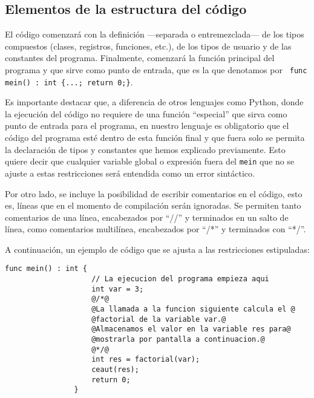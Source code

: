 \documentclass[10pt,a4paper]{article}
\begin{document}
\subsection{Elementos de la estructura del código}\label{subsec:Elementos de la estructura del código}
El código comenzará con la definición ---separada o entremezclada--- de los tipos compuestos (clases, registros, funciones, etc.), de los tipos de usuario y de las constantes del programa. Finalmente, comenzará la función principal del programa y que sirve como punto de entrada, que es la que denotamos por \texttt{\color{blue} func mein() : int \{...; return 0;\}}.

Es importante destacar que, a diferencia de otros lenguajes como Python, donde la ejecución del código no requiere de una función ``especial'' que sirva como punto de entrada para el programa, en nuestro lenguaje es obligatorio que el código del programa esté dentro de esta función final y que fuera solo se permita la declaración de tipos y constantes que hemos explicado previamente. Esto quiere decir que cualquier variable global o expresión fuera del \texttt{mein} que no se ajuste a estas restricciones será entendida como un error sintáctico.

Por otro lado, se incluye la posibilidad de escribir comentarios en el código, esto es, líneas que en el momento de compilación serán ignoradas. Se permiten tanto comentarios de una línea, encabezados por ``//'' y terminados en un salto de línea, como comentarios multilínea, encabezados por ``/*'' y terminados con ``*/''.

A continuación, un ejemplo de código que se ajusta a las restricciones estipuladas:

\begin{center}
    \begin{minipage}{\linewidth}
        \begin{lstlisting}[linewidth=0.7\linewidth, gobble=16]
                func mein() : int {
                    // La ejecucion del programa empieza aqui
                    int var = 3;
                    @/*@
                    @La llamada a la funcion siguiente calcula el @
                    @factorial de la variable var.@
                    @Almacenamos el valor en la variable res para@
                    @mostrarla por pantalla a continuacion.@
                    @*/@
                    int res = factorial(var);
                    ceaut(res);
                    return 0;
                }
        \end{lstlisting}
    \end{minipage}
\end{center}
\end{document}
